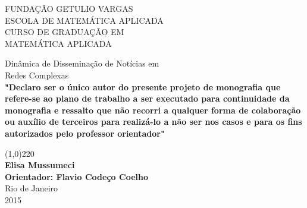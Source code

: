 \documentclass[a4paper,12pt]{article}
\begin{document}
\begin{titlepage}
 
 \begin{center}
  {\large FUNDAÇÃO GETULIO VARGAS}\\[0.3cm]
  {\large ESCOLA DE MATEMÁTICA APLICADA}\\[0.5cm]
  {\large CURSO DE GRADUAÇÃO EM}\\[0.3cm]
  {\large MATEMÁTICA APLICADA}\\[0.3cm]


  \vspace{20 mm}


  {\large Dinâmica de Disseminação de Notícias em}\\[0.1cm]
  {\large Redes Complexas}\\[2.5cm]

  
  \bf "Declaro ser o único autor do presente projeto de monografia que refere-se ao
plano de trabalho a ser executado para continuidade da monografia e ressalto
que não recorri a qualquer forma de colaboração ou auxílio de terceiros para
realizá-lo a não ser nos casos e para os fins autorizados pelo professor orientador"

  \vspace{3.5cm}


  \line(1,0){220}\\[0.1cm]
  {\bf Elisa Mussumeci}\\[2cm]
  {\bf Orientador: Flavio Codeço Coelho}\\[5cm]




  {Rio de Janeiro}\\[0.1cm]
  {2015}
 \end{center}
\end{titlepage}
\end{document}

